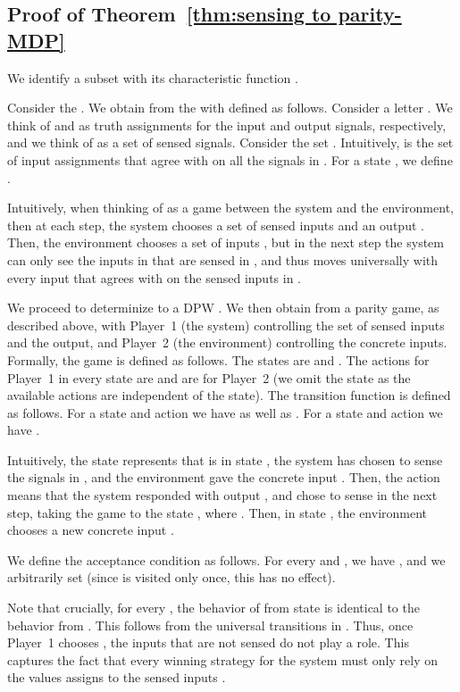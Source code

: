\documentclass[runningheads,a4paper]{llncs}
\begin{document}
\subsection{Proof of Theorem~\ref{thm:sensing to parity-MDP}}
\label{app sen construction}

We identify a subset  with its characteristic function . 

Consider the  . We obtain from  the   with  defined as follows. Consider a letter . We think of  and  as truth assignments for the input and output signals, respectively, and we think of  as a set of sensed signals. Consider the set . Intuitively,  is the set of input assignments that agree with  on all the signals in . For a state , we define . 

Intuitively, when thinking of  as a game between the system and the environment, then at each step, the system chooses a set of sensed inputs  and an output . Then, the environment chooses a set of inputs , but in the next step the system can only see the inputs in  that are sensed in , and thus moves universally with every input that agrees with  on the sensed inputs in .

We proceed to determinize  to a DPW . We then obtain from  a parity game, as described above, with Player~1 (the system) controlling the set of sensed inputs and the output, and Player~2 (the environment) controlling the concrete inputs. Formally, the game 
 is defined as follows. The states are  and . The actions for Player~1 in every state are  and are  for Player~2 (we omit the state as the available actions are independent of the state). The transition function is defined as follows. For a state  and action  we have  as well as . 
For a state  and action  we have . 

Intuitively, the state  represents that  is in state , the system has chosen to sense the signals in , and the environment gave the concrete input . Then, the action  means that the system responded with output , and chose to sense  in the next step, taking the game to the state , where . Then, in state , the environment chooses a new concrete input .

We define the acceptance condition  as follows. For every  and , we have , and we arbitrarily set  (since  is visited only once, this has no effect).

Note that crucially, for every , the behavior of  from state  is identical to the behavior from . This follows from the universal transitions in . Thus, once Player~1 chooses , the inputs that are not sensed do not play a role. This captures the fact that every winning strategy for the system must only rely on the values  assigns to the sensed inputs .
\end{document}
